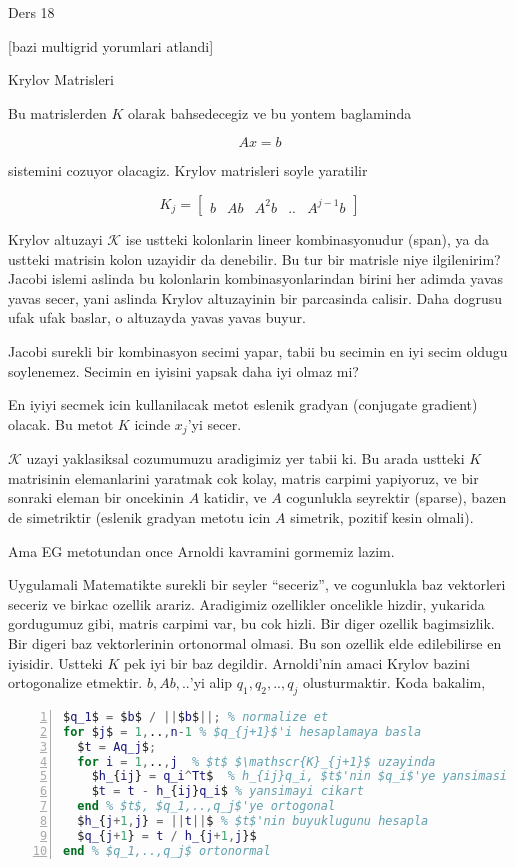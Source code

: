 \documentclass[12pt,fleqn]{article}\usepackage{../common}
\begin{document}
Ders 18

[bazi multigrid yorumlari atlandi]

Krylov Matrisleri 

Bu matrislerden $K$ olarak bahsedecegiz ve bu yontem baglaminda 

\[ Ax = b \]

sistemini cozuyor olacagiz. Krylov matrisleri soyle yaratilir

\[ K_j = \left[\begin{array}{rrrrr}
b & Ab & A^2b & .. & A^{j-1}b
\end{array}\right] \]

Krylov altuzayi $\mathscr{K}$ ise ustteki kolonlarin lineer kombinasyonudur
(span), ya da ustteki matrisin kolon uzayidir da denebilir. Bu tur bir
matrisle niye ilgilenirim? Jacobi islemi aslinda bu kolonlarin
kombinasyonlarindan birini her adimda yavas yavas secer, yani aslinda
Krylov altuzayinin bir parcasinda calisir. Daha dogrusu ufak ufak baslar, o
altuzayda yavas yavas buyur.

Jacobi surekli bir kombinasyon secimi yapar, tabii bu secimin en iyi secim
oldugu soylenemez. Secimin en iyisini yapsak daha iyi olmaz mi? 

En iyiyi secmek icin kullanilacak metot eslenik gradyan (conjugate
gradient) olacak. Bu metot $K$ icinde $x_j$'yi secer. 

$\mathscr{K}$ uzayi yaklasiksal cozumumuzu aradigimiz yer tabii ki. Bu arada ustteki
$K$ matrisinin elemanlarini yaratmak cok kolay, matris carpimi yapiyoruz, ve
bir sonraki eleman bir oncekinin $A$ katidir, ve $A$ cogunlukla seyrektir
(sparse), bazen de simetriktir (eslenik gradyan metotu icin $A$ simetrik,
pozitif kesin olmali).

Ama EG metotundan once Arnoldi kavramini gormemiz lazim. 

Uygulamali Matematikte surekli bir seyler ``seceriz'', ve cogunlukla baz
vektorleri seceriz ve birkac ozellik arariz. Aradigimiz ozellikler
oncelikle hizdir, yukarida gordugumuz gibi, matris carpimi var, bu cok
hizli. Bir diger ozellik bagimsizlik. Bir digeri baz vektorlerinin
ortonormal olmasi. Bu son ozellik elde edilebilirse en iyisidir. Ustteki
$K$ pek iyi bir baz degildir. Arnoldi'nin amaci Krylov bazini ortogonalize
etmektir. $b,Ab,..$'yi alip $q_1,q_2,..,q_j$ olusturmaktir. Koda bakalim, 

\begin{lstlisting}[language=Matlab,mathescape,numbers=left,xleftmargin=4.0ex]
$q_1$ = $b$ / ||$b$||; % normalize et
for $j$ = 1,..,n-1 % $q_{j+1}$'i hesaplamaya basla
  $t = Aq_j$; 
  for i = 1,..,j  % $t$ $\mathscr{K}_{j+1}$ uzayinda
    $h_{ij} = q_i^Tt$  % h_{ij}q_i, $t$'nin $q_i$'ye yansimasi
    $t = t - h_{ij}q_i$ % yansimayi cikart
  end % $t$, $q_1,..,q_j$'ye ortogonal
  $h_{j+1,j} = ||t||$ % $t$'nin buyuklugunu hesapla
  $q_{j+1} = t / h_{j+1,j}$ 
end % $q_1,..,q_j$ ortonormal
\end{lstlisting}
\end{document}
